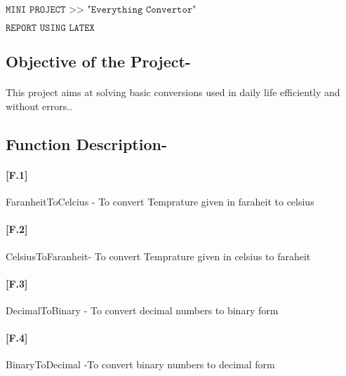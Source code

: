 \documentclass[12pt,a4paper]{article}
\begin{document}
\begin{Huge}
\begin{center}
$\texttt{MINI PROJECT >> "Everything Convertor"}$
\end{center}

\end{Huge}

\begin{Large}
\begin{center}
$\texttt{REPORT USING LATEX}$
\end{center}
\end{Large}

\subsection{Objective of the Project-}

\paragraph{}This project aims at solving basic conversions used in daily life 
efficiently and without errors..\\



\subsection{Function Description-}

\paragraph{[F.1]}FaranheitToCelcius - To convert Temprature given in faraheit to celsius			
\\														
\paragraph{[F.2]}CelsiusToFaranheit- To convert Temprature given in celsius to faraheit
\\												
\paragraph{[F.3]}DecimalToBinary - To convert decimal numbers to binary form				
\\				
\paragraph{[F.4]}BinaryToDecimal -To convert binary numbers to decimal form
\\
\end{document}

